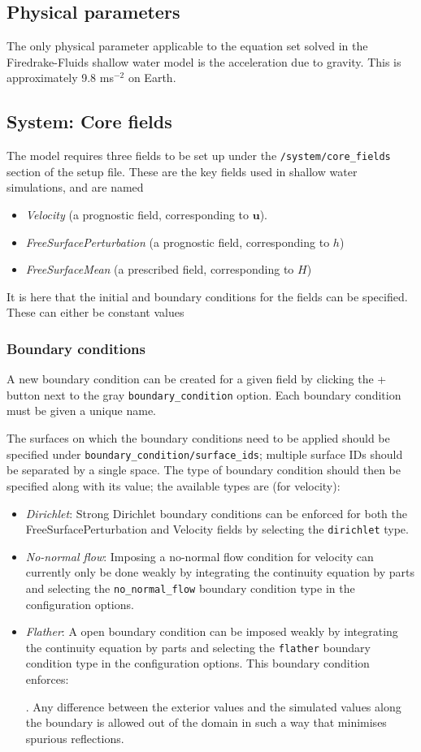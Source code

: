 \documentclass[a4paper,11pt]{report}
\begin{document}
\subsection{Physical parameters}
The only physical parameter applicable to the equation set solved in the Firedrake-Fluids shallow water model is the acceleration due to gravity. This is approximately 9.8 ms$^{-2}$ on Earth.

\subsection{System: Core fields}
The model requires three fields to be set up under the \texttt{/system/core\_fields} section of the setup file. These are the key fields used in shallow water simulations, and are named
\begin{itemize}
   \item \textit{Velocity} (a prognostic field, corresponding to $\mathbf{u}$).
   \item \textit{FreeSurfacePerturbation} (a prognostic field, corresponding to $h$)
   \item \textit{FreeSurfaceMean} (a prescribed field, corresponding to $H$)
\end{itemize}
It is here that the initial and boundary conditions for the fields can be specified. These can either be constant values

\subsubsection{Boundary conditions}
A new boundary condition can be created for a given field by clicking the + button next to the gray \texttt{boundary\_condition} option. Each boundary condition must be given a unique name.

The surfaces on which the boundary conditions need to be applied should be specified under \texttt{boundary\_condition/surface\_ids}; multiple surface IDs should be separated by a single space. The type of boundary condition should then be specified along with its value; the available types are (for velocity):
\begin{itemize}
   \item \textit{Dirichlet}: Strong Dirichlet boundary conditions can be enforced for both the FreeSurfacePerturbation and Velocity fields by selecting the \texttt{dirichlet} type.
   \item \textit{No-normal flow}: Imposing a no-normal flow condition for velocity can currently only be done weakly by integrating the continuity equation by parts and selecting the \texttt{no\_normal\_flow} boundary condition type in the configuration options.
   \item \textit{Flather}: A \cite{Flather_1976} open boundary condition can be imposed weakly by integrating the continuity equation by parts and selecting the \texttt{flather} boundary condition type in the configuration options. This boundary condition enforces:
   
   
   . Any difference between the exterior values and the simulated values along the boundary is allowed out of the domain in such a way that minimises spurious reflections.
\end{itemize}
\end{document}

